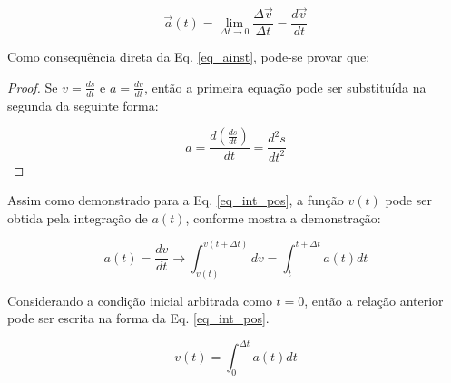 \documentclass[a4paper, 11pt]{report}
\newtheorem{proof}{Demonstração}
\begin{document}
\begin{equation}
    \vec{a}(t) = \lim_{\Delta t\rightarrow 0} \frac{\Delta \vec{v}}{\Delta t} = 
    \frac{d \vec{v}}{d t}
    \label{eq_ainst}
\end{equation}

Como consequência direta da Eq. \ref{eq_ainst}, pode-se provar que:

\begin{proof}
Se $v = \frac{ds}{dt}$ e $a = \frac{dv}{dt}$, então a primeira equação pode 
ser substituída na segunda da seguinte forma:

\begin{equation}
a = \frac{d\left( \frac{ds}{dt}\right)}{dt} = \frac{d^2 s}{dt^2}
\end{equation}

\end{proof}

Assim como demonstrado para a Eq. \ref{eq_int_pos}, a função $v(t)$ pode 
ser obtida pela integração de $a(t)$, conforme mostra a demonstração:

$$
a(t) = \frac{d v}{dt} \rightarrow 
\int_{v(t)}^{v(t+\Delta t)} dv = \int_{t}^{t+\Delta t} a(t) dt
$$


Considerando a condição inicial arbitrada como $t=0$, então
a relação anterior pode ser escrita na forma da Eq. \ref{eq_int_pos}.

\begin{equation}
    v(t) = \int_{0}^{\Delta t} a(t) dt
    \label{eq_int_pos_}
\end{equation}
\end{document}
